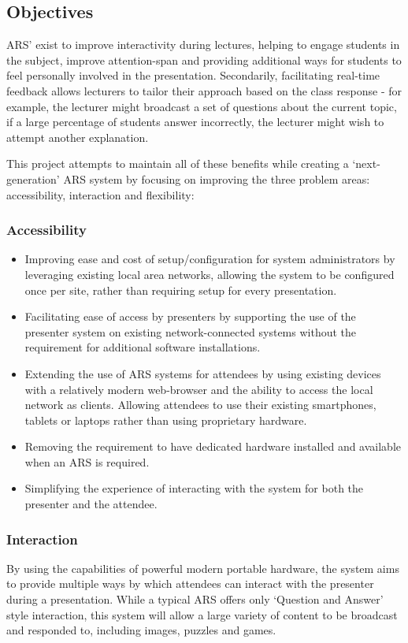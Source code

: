 \documentclass[a4papert,11pt,notitlepage]{article}
\begin{document}
\subsection{Objectives}
ARS' exist to improve interactivity during lectures, helping to engage students in the subject, improve attention-span and providing additional ways for students to feel personally involved in the presentation. Secondarily, facilitating real-time feedback allows lecturers to tailor their approach based on the class response - for example, the lecturer might broadcast a set of questions about the current topic, if a large percentage of students answer incorrectly, the lecturer might wish to attempt another explanation. 

This project attempts to maintain all of these benefits while creating a `next-generation' ARS system by focusing on improving the three problem areas: accessibility, interaction and flexibility:

\subsubsection{Accessibility}
\begin{itemize}
\item Improving ease and cost of setup/configuration for system administrators by leveraging existing local area networks, allowing the system to be configured once per site, rather than requiring setup for every presentation.
\item Facilitating ease of access by presenters by supporting the use of the presenter system on existing network-connected systems without the requirement for additional software installations.
\item Extending the use of ARS systems for attendees by using existing devices with a relatively modern web-browser and the ability to access the local network as clients. Allowing attendees to use their existing smartphones, tablets or laptops rather than using proprietary hardware.
\item Removing the requirement to have dedicated hardware installed and available when an ARS is required.
\item Simplifying the experience of interacting with the system for both the presenter and the attendee.
\end{itemize}

\subsubsection{Interaction}
By using the capabilities of powerful modern portable hardware, the system aims to provide multiple ways by which attendees can interact with the presenter during a presentation. While a typical ARS offers only `Question and Answer' style interaction, this system will allow a large variety of content to be broadcast and responded to, including images, puzzles and games.
\end{document}
